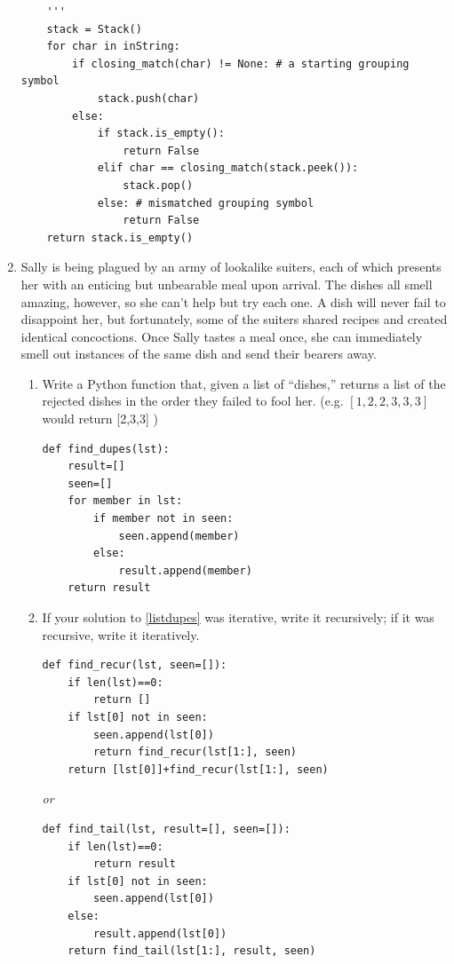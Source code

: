 \documentclass[11pt]{article}
\newenvironment{answer}{\large\lstset{basicstyle=\tiny}\color{white}}{}
\newenvironment{answer}{\large\lstset{basicstyle=\large}\color{red}}{}
\begin{document}
\begin{enumerate}
\begin{answer}
\begin{lstlisting}
    '''
    stack = Stack()
    for char in inString:
        if closing_match(char) != None: # a starting grouping symbol
            stack.push(char)
		else:
			if stack.is_empty():
				return False
			elif char == closing_match(stack.peek()):
				stack.pop()
			else: # mismatched grouping symbol
				return False
    return stack.is_empty()
    \end{lstlisting}
    \end{answer}
\vspace{1.5in}

\newpage
\item
Sally is being plagued by an army of lookalike suiters, each of which presents her with an enticing but unbearable meal upon arrival.
The dishes all smell amazing, however, so she can't help but try each one.
A dish will never fail to disappoint her, but fortunately, some of the suiters shared recipes and created identical concoctions.
Once Sally tastes a meal once, she can immediately smell out instances of the same dish and send their bearers away.
\begin{enumerate}
\item
\label{listdupes}
Write a Python function that, given a list of ``dishes,'' returns a list of the rejected dishes in the order they failed to fool her. (e.g. $[1, 2, 2, 3, 3, 3]$ would return [2,3,3] )
\begin{answer}
\begin{lstlisting}
def find_dupes(lst):
	result=[]
	seen=[]
	for member in lst:
		if member not in seen:
			seen.append(member)
		else:
			result.append(member)
	return result
\end{lstlisting}
\end{answer}

\item
If your solution to \ref{listdupes} was iterative, write it recursively; if it was recursive, write it iteratively.
\begin{answer}
\begin{lstlisting}
def find_recur(lst, seen=[]):
	if len(lst)==0:
		return []
	if lst[0] not in seen:
		seen.append(lst[0])
		return find_recur(lst[1:], seen)
	return [lst[0]]+find_recur(lst[1:], seen)
\end{lstlisting}
\textit{or}
\begin{lstlisting}
def find_tail(lst, result=[], seen=[]):
	if len(lst)==0:
		return result
	if lst[0] not in seen:
		seen.append(lst[0])
	else:
		result.append(lst[0])
	return find_tail(lst[1:], result, seen)
\end{lstlisting}
\end{answer}


\end{enumerate}
\end{enumerate}
\end{document}
